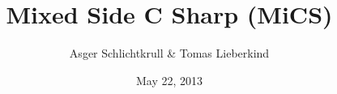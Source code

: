 \documentclass[12pt]{report}   						%
\begin{document}
\title{Mixed Side C Sharp (MiCS)}
\author{Asger Schlichtkrull \& Tomas Lieberkind}
\date{May 22, 2013}
\maketitle



\tableofcontents














\end{document}
